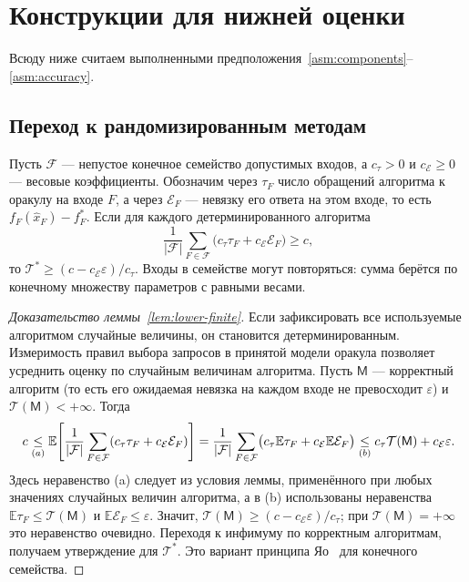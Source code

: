 \section{Конструкции для нижней оценки}\label{app:lower-proofs}

Всюду ниже считаем выполненными предположения~\ref{asm:components}--\ref{asm:accuracy}.

\subsection{Переход к рандомизированным методам}

\begin{lemma}\label{lem:lower-finite}
Пусть $\mathcal F$ --- непустое конечное семейство допустимых входов,
а $c_\tau>0$ и $c_{\mathcal E}\ge0$ --- весовые коэффициенты.
Обозначим через $\tau_F$ число обращений алгоритма к оракулу на входе $F$,
а через $\mathcal E_F$ --- невязку его ответа на этом входе,
то есть $f_F(\hat x_F)-f_F^\ast$.
Если для каждого детерминированного алгоритма
\[
 \frac1{|\mathcal F|}\sum_{F\in\mathcal F}
 \bigl(c_\tau\tau_F+c_{\mathcal E}\mathcal E_F\bigr)\ge c,
\]
то $\mathcal T^\ast\ge(c-c_{\mathcal E}\varepsilon)/c_\tau$.
Входы в семействе могут повторяться: сумма берётся по конечному множеству
параметров с равными весами.
\end{lemma}

\begin{proof}[Доказательство леммы~\ref{lem:lower-finite}]
Если зафиксировать все используемые алгоритмом случайные величины,
он становится детерминированным. Измеримость правил выбора запросов
в принятой модели оракула позволяет усреднить оценку
по случайным величинам алгоритма.
Пусть $\mathsf M$ --- корректный алгоритм (то есть его ожидаемая
невязка на каждом входе не превосходит $\varepsilon$) и $\mathcal T(\mathsf M)<+\infty$.
Тогда
\[
 c \mathrel{\underset{(a)}{\le}}
 \mathbb E\!\left[
 \frac1{|\mathcal F|}\sum_{F\in\mathcal F}
 (c_\tau\tau_F+c_{\mathcal E}\mathcal E_F)\right] =
 \frac1{|\mathcal F|}\sum_{F\in\mathcal F}
 \bigl(c_\tau\mathbb E\tau_F+
 c_{\mathcal E}\mathbb E\mathcal E_F\bigr) \mathrel{\underset{(b)}{\le}}
 c_\tau\mathcal T(\mathsf M)+c_{\mathcal E}\varepsilon.
\]
Здесь неравенство (a) следует из условия леммы, применённого при любых значениях случайных величин алгоритма,
а в (b) использованы неравенства $\mathbb E\tau_F\le\mathcal T(\mathsf M)$
и $\mathbb E\mathcal E_F\le\varepsilon$.
Значит, $\mathcal T(\mathsf M)\ge(c-c_{\mathcal E}\varepsilon)/c_\tau$;
при $\mathcal T(\mathsf M)=+\infty$ это неравенство очевидно.
Переходя к инфимуму по корректным алгоритмам, получаем утверждение
для $\mathcal T^\ast$. Это вариант принципа Яо~\citep{yao1977} для конечного семейства.
\end{proof}

